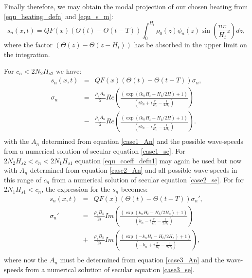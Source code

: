 \documentclass[a4paper,10pt]{article}
\newcommand{\heavi}{\Theta}
\begin{document}
Finally therefore, we may obtain the modal projection of our chosen heating from \ref{equ_heating_defn} and \ref{equ_s_m}:
%
\begin{equation}
 s_n (x,t) = Q F(x) \left( \heavi(t) - \heavi(t-T) \right) \int_0^{H_t} \rho_0(z) \phi_n(z) \sin \left( \frac{n \pi}{H_t} z \right) dz,
\end{equation}
%
where the factor $ (\heavi(z) - \heavi(z-H_t))$ has be absorbed in the upper limit on the integration. 

For $c_n<2N_2H_{s2}$ we have:
%
\begin{eqnarray}
\label{equ_coeff_defn1}
 s_n (x,t) & = &  Q F(x) \left(\heavi(t) - \heavi(t-T) \right) \sigma_n, \\ \nonumber
\sigma_n & = &  \frac{ \rho_s A_n  } {2 } Re \left( \frac{ \left( \exp \left( i k_n H_t - H_t / 2H \right) +1 \right) }{ \left( i k_n + i \frac{\pi }{H_t} - \frac{1}{2 H_s} \right) } \right) \\ \nonumber
                 & - & \frac{ \rho_s A_n  } {2 } Re \left( \frac{ \left( \exp \left( i k_n H_t - H_t / 2H \right) +1 \right) }{ \left( i k_n - i \frac{\pi }{H_t} - \frac{1}{2 H_s} \right) } \right). \\ \nonumber
\end{eqnarray}
%
with the $A_n$ determined from equation \ref{case1_An} and the possible wave-speeds from a numerical solution of secular equation \ref{case1_se}.
For $2 N_2 H_{s2} < c_n  < 2 N_1 H_{s1}$ equation \ref{equ_coeff_defn1} may again be used but now with 
$A_n$ determined from equation \ref{case2_An} and all possible wave-speeds in this range of $c_n$ from a numerical solution of secular equation \ref{case2_se}.
For  for $2 N_1 H_{s1} < c_n$, the expression for the $s_n$ becomes:
%
\begin{eqnarray}
\label{equ_coeff_defn2}
s_n (x,t) & = &  Q F(x) \left(\heavi(t) - \heavi(t-T) \right) \sigma_n', \\ \nonumber
\sigma_n' & = &  \frac{ \rho_s B_n  } {2i} Im \left( \frac{ \left( \exp \left( k_n H_t - H_t / 2H_s \right) +1 \right) }{ \left( k_n - i \frac{\pi }{H_t} - \frac{1}{2 H_s} \right) } \right) \\ \nonumber
                 & + &  \frac{ \rho_s B_n  } {2i} Im \left( \frac{ \left( \exp \left( - k_n H_t - H_t / 2H_s \right) +1 \right) }{ \left(- k_n + i \frac{\pi }{H_t} - \frac{1}{2 H_s} \right) } \right), \\ \nonumber
\end{eqnarray}
%
where now the $A_n$ must be determined from equation \ref{case3_An} and the wave-speeds from a numerical solution of secular equation \ref{case3_se}.
%
%
%
\end{document}

